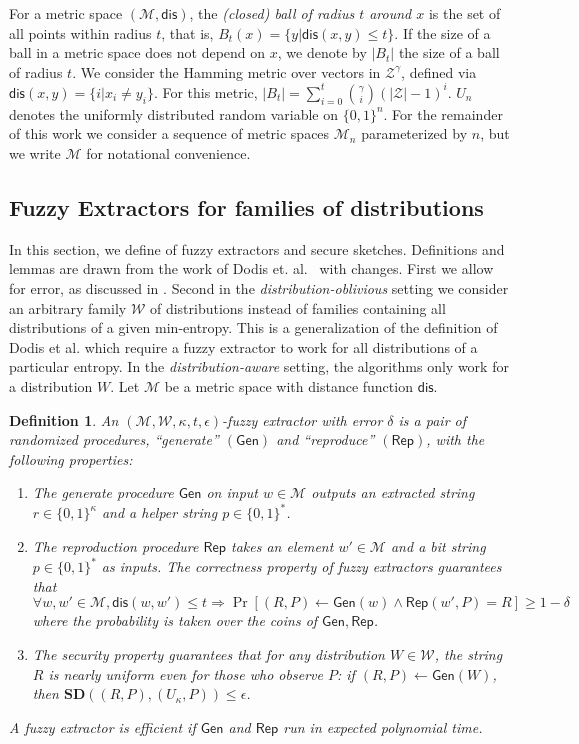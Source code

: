 \documentclass[11pt]{article}
\newcommand{\class}[1]{{\ensuremath{\mathsf{#1}}}}
\newcommand{\gen}{\ensuremath{\class{Gen}}\xspace}
\newcommand{\rep}{\ensuremath{\class{Rep}}\xspace}
\newcommand{\dis}{\ensuremath{\mathsf{dis}}}
\newtheorem{definition}[theorem]{Definition}
\begin{document}
For a metric space $(\mathcal{M}, \dis)$, the \emph{(closed) ball of radius $t$ around $x$} is the set of all points within radius $t$, that is, $B_t(x) = \{y| \dis(x, y)\leq t\}$.  If the size of a ball in a metric space does not depend on $x$, we denote by $|B_t|$ the size of a ball of radius $t$.  We consider the Hamming metric over vectors in $\mathcal{Z}^\gamma$, defined via $\dis(x,y) = \{i | x_i \neq y_i\}$.  For this metric, $|B_t| = \sum_{i=0}^t {\gamma \choose i} (|\mathcal{Z}|-1)^i $.  $U_n$ denotes the uniformly  distributed random variable on $\{0,1\}^n$.  For the remainder of this work we consider a sequence of metric spaces $\mathcal{M}_n$ parameterized by $n$, but we write $\mathcal{M}$ for notational convenience.

\subsection{Fuzzy Extractors for families of distributions}\label{sec:fuzz extractor}

In this section, we define of fuzzy extractors and secure sketches.  Definitions and lemmas are drawn from the work of Dodis et. al.~\cite[Sections 2.5--4.1]{DBLP:journals/siamcomp/DodisORS08} with changes.  First we allow for error, as discussed in \cite[Sections 8]{DBLP:journals/siamcomp/DodisORS08}.  Second in the \emph{distribution-oblivious} setting we consider an arbitrary family $\mathcal{W}$ of distributions instead of families containing all distributions of a given min-entropy.  This is a generalization of the definition of Dodis et al. which require a fuzzy extractor to work for all distributions of a particular entropy.  In the \emph{distribution-aware} setting, the algorithms only work for a distribution $W$.  Let $\mathcal{M}$ be a metric space with distance function $\dis$.

\begin{definition}
\label{def:fuzzy extractor}
An $(\mathcal{M}, \mathcal{W}, \kappa, t, \epsilon)$-\emph{fuzzy extractor} with error $\delta$ is a pair of randomized procedures, ``generate'' $(\gen)$ and ``reproduce'' $(\rep)$, with the following properties: 
\begin{enumerate}
\item The generate procedure \gen on input $w\in \mathcal{M}$ outputs an extracted string $r\in\{0,1\}^\kappa$ and a helper string $p\in\{0,1\}^*$.
\item The reproduction procedure \rep takes an element $w'\in \mathcal{M}$ and a bit string $p\in\{0,1\}^*$ as inputs.  The \emph{correctness} property of fuzzy extractors guarantees that
\[
\forall w, w'\in \mathcal{M}, \dis(w, w')\le t \Rightarrow \Pr[(R, P)\leftarrow \gen(w) \wedge \rep(w', P) =R] \ge 1-\delta
\]
where the probability is taken over the coins of $\gen, \rep$.
\item The \emph{security} property guarantees that for any distribution $W\in\mathcal{W}$, the string $R$ is nearly uniform even for those who observe $P$:  if $(R,P)\leftarrow\gen (W)$, then $\mathbf{SD}((R,P),(U_\kappa,P))\leq \epsilon$.
\end{enumerate}
A fuzzy extractor is efficient if $\gen$ and $\rep$ run in expected polynomial time.
\end{definition}
\end{document}
